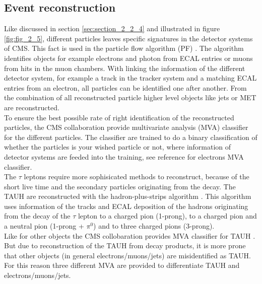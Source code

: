 \subsection{Event reconstruction}
\label{sec:section_3_2_1}

Like discussed in section \ref{sec:section_2_2_4} and illustrated in figure \ref{fig:fig_2_5}, different particles leaves specific signatures in the detector systems of \gls{CMS}. This fact is used in the particle flow algorithm (\gls{PF}) \cite{PF}. The algorithm identifies objects for example electrons and photon from \gls{ECAL} entries or muons from hits in the muon chambers. With linking the information of the different detector system, for example a track in the tracker system and a matching \gls{ECAL} entries from an electron, all particles can be identified one after another.  From the combination of all reconstructed particle higher level objects like jets or \gls{MET} are reconstructed. \\

To ensure the best possible rate of right identification of the reconstructed particles, the \gls{CMS} collaboration provide multivariate analysis (\gls{MVA}) classifier for the different particles. The classifier are trained to do a binary classification of whether the particles is your wished particle or not, where information of detector systems are feeded into the training, see reference \cite{ERECO} for electrons \gls{MVA} classifier. \\

The $\tau$ leptons require more sophisicated methods to reconstruct, because of the short live time and the secondary particles originating from the decay. The \gls{TAUH} are reconstructed with the hadron-plus-strips algorithm \cite{TAURECO}. This algorithm uses information of the tracks and ECAL deposition of the hadrons originating from the decay of the $\tau$ lepton to a charged pion (1-prong), to a charged pion and a neutral pion (1-prong + $\pi^0$) and to three charged pions (3-prong). \\

Like for other objects the \gls{CMS} collobaration provides \gls{MVA} classifier for \gls{TAUH} \cite{TAURECO}. But due to reconstruction of the \gls{TAUH} from decay products, it is more prone that other objects (in general electrons/muons/jets) are misidentified as \gls{TAUH}. For this reason three different \gls{MVA} are provided to differentiate \gls{TAUH} and electrons/muons/jets. \\

